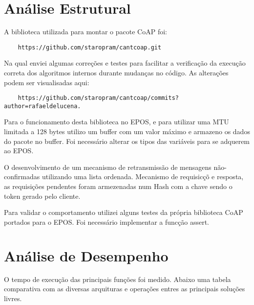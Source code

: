 \section{An\'alise Estrutural}
A biblioteca utilizada para montar o pacote CoAP foi:
\begin{lstlisting}
    https://github.com/staropram/cantcoap.git
 \end{lstlisting} Na qual enviei algumas corre\c{c}\~oes e testes para facilitar a verifica\c{c}\~ao da execu\c{c}\~ao correta dos algoritmos internos durante mudan\c{c}as no c\'odigo. As altera\c{c}\~oes podem ser visualisadas aqui: \begin{lstlisting}
    https://github.com/staropram/cantcoap/commits?author=rafaeldelucena.
\end{lstlisting}

Para o funcionamento desta biblioteca no EPOS, e para utilizar uma MTU limitada a 128 bytes utilizo um buffer com um valor m\'aximo e armazeno os dados do pacote no buffer. Foi necess\'ario alterar os tipos das vari\'aveis para se adquerem ao EPOS.

O desenvolvimento de um mecanismo de retransmiss\~ao de mensagens n\~ao-confirmadas utilizando uma lista ordenada. Mecanismo de requisic\c{c}\~o e resposta, as requisi\c{c}\~oes pendentes foram armezenadas num Hash com a chave sendo o token gerado pelo cliente.

Para validar o comportamento utilizei alguns testes da pr\'opria biblioteca CoAP portados para o EPOS. Foi necess\'ario implementar a func\c{c}\~ao assert.

\section{An\'alise de Desempenho}

O tempo de execu\c{c}\~ao das principais fun\c{c}\~oes foi medido. Abaixo uma tabela comparativa com as diversas arquituras e opera\c{c}\~oes entres as principais solu\c{c}\~oes livres.

